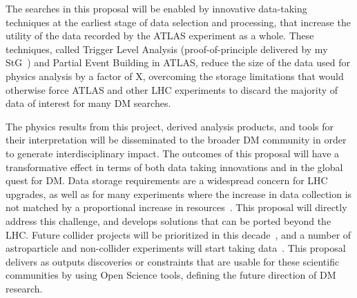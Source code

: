 \documentclass[11pt,a4paper]{article}
\begin{document}
The searches in this proposal will be enabled by innovative data-taking techniques at the earliest stage of data selection and processing, that increase the utility of the data recorded by the ATLAS experiment as a whole. These techniques, called Trigger Level Analysis (proof-of-principle delivered by my StG~\cite{PRL}) and Partial Event Building in ATLAS, reduce the size of the data used for physics analysis by a factor of \color{red}X\color{black}, overcoming the storage limitations that would otherwise force ATLAS and other LHC experiments to discard the majority of data of interest for many DM searches. %

The physics results from this project, derived analysis products, and tools for their interpretation will be disseminated to the broader DM community in order to generate interdisciplinary impact.
The outcomes of this proposal will have a transformative effect in terms of both data taking innovations and in the global quest for DM. 
Data storage requirements are a widespread concern for LHC upgrades, as well as for many experiments where the increase in data collection is not matched by a proportional increase in resources~\cite{HSF}. 
This proposal will directly address this challenge, and develops solutions that can be ported beyond the LHC. 
Future collider projects will be prioritized in this decade~\cite{EuropeanStrategy}, and a number of astroparticle and non-collider experiments will start taking data~\cite{Astro2020}. 
This proposal delivers as outputs discoveries or constraints that are usable for these scientific communities by using Open Science tools, defining the future direction of DM research. 
\end{document}
